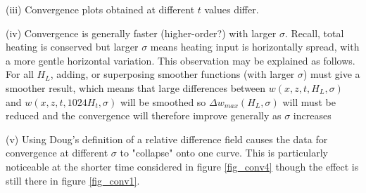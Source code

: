 \documentclass[12pt]{article}
\begin{document}
(iii) Convergence plots obtained at different $t$ values differ. 

(iv) Convergence is generally faster (higher-order?) with larger $\sigma$. Recall, total heating is conserved but larger $\sigma$ means heating input is horizontally spread, with a more gentle horizontal variation. This observation may be explained as follows. For all $H_L$, adding, or superposing smoother functions (with larger $\sigma$) must give a smoother result, which means that large differences between $w(x,z,t,H_L,\sigma)$ and $w(x,z,t,1024H_t, \sigma)$ will be smoothed 
so $\Delta w_{max} (H_L,\sigma)$ will must be reduced and the convergence will therefore improve generally as $\sigma$ increases

(v) Using Doug's definition of a relative difference field causes the data for convergence at different $\sigma$ to "collapse" onto one curve. This is particularly noticeable at
the shorter time considered in figure \ref{fig_conv4} though the effect is still there in figure \ref{fig_conv1}. 
\end{document}
